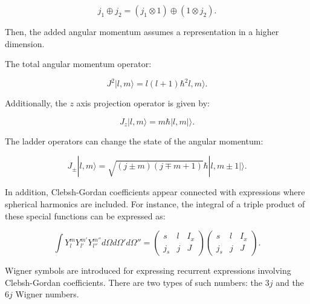 \documentclass[openany]{book}
\begin{document}
\begin{equation}\label{eq:angularMomentum_tensorProduct_addition}
	j_1 \oplus j_2 = (j_1 \otimes 1) \oplus  (1 \otimes j_2). 
\end{equation}

Then, the added angular momentum assumes a representation in a higher dimension. 

The total angular momentum operator:

\begin{equation}\label{eq:angularMomentum_J2}
	J^2|l, m \rangle  = l(l+1)\hbar^2 l, m \rangle. 
\end{equation}

Additionally, the $z$ axis projection operator is given by: 

\begin{equation}\label{eq:angularMomentum_Jz}
	J_z|l, m \rangle  =m \hbar |l, m| \rangle. 
\end{equation}

The ladder operators can change the state of the angular momentum:

\begin{equation}\label{eq:angularMomentum_Jladder}
	J_\pm|l, m \rangle  = \sqrt{(j \pm m)(j \mp m + 1)} \hbar |l, m \pm 1| \rangle. 
\end{equation}



In addition, Clebsh-Gordan coefficients appear connected with expressions where spherical harmonics are included. For instance, the integral of a triple product of these special functions can be expressed as: 

\begin{equation}  \label{eq:angularMomentum_ClebshGordan_sphericalHarmonics}
	\int Y_l^{m} Y_{l'}^{m'}Y_{l''}^{m''} d\Omega d\Omega ' d\Omega '' = 	\left(\begin{array}{ccc}
		s &	l &	I_x \\
		j_s & j & J
	\end{array}\right) \left(\begin{array}{ccc}
	s &	l &	I_x \\
	j_s & j & J
\end{array}\right). 
\end{equation}

Wigner symbols are introduced for expressing recurrent expressions involving Clebsh-Gordan coefficients. There are two types of such numbers: the $3j$ and the $6j$ Wigner numbers. \\
\end{document}
